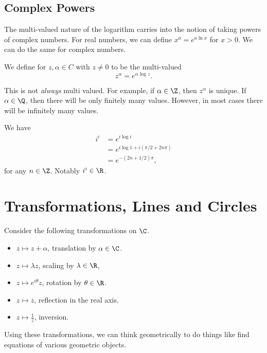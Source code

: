 \documentclass[a4paper]{scrreprt}
\begin{document}
\subsection{Complex Powers}

The multi-valued nature of the logarithm carries into the notion of taking powers of complex numbers.
For real numbers, we can define $x^a = e^{a \ln x}$ for $x > 0$. We can do the same for complex numbers.

\begin{definition}
	We define  for $z, \alpha \in C$ with $z \neq 0$ to be the multi-valued
	$$
	z^{\alpha} = e^{\alpha \log z}.
	$$
\end{definition}

This is not \emph{always} multi valued. For example, if $\alpha \in \Z$, then $z^\alpha$ is unique. If $\alpha \in \Q$, then there will be only finitely many values. However, in most cases there will be infinitely many values.

\begin{example}[Calculating $i^i$]
	We have
	\begin{align*}
		i^i &= e^{i \log i} \\
		&= e^{i \log 1 + i(\pi/2 + 2n\pi)} \\
		&= e^{-(2n + 1/2)\pi},
	\end{align*}
	for any $n \in \Z$. Notably $i^i \in \R$.
\end{example}


\section{Transformations, Lines and Circles}

Consider the following transformations on $\C$.
\begin{itemize}
	\item $z \mapsto z + \alpha$, translation by $\alpha \in \C$.
	\item $z \mapsto \lambda z$, scaling by $\lambda \in \R$,
	\item $z \mapsto e^{i \theta} z$, rotation by $\theta \in \R$. 
	\item $z \mapsto \overline{z}$, reflection in the real axis.
	\item $z \mapsto \frac{1}{z}$, inversion.
\end{itemize}
Using these transformations, we can think geometrically to do things like find equations of various geometric objects.
\end{document}
